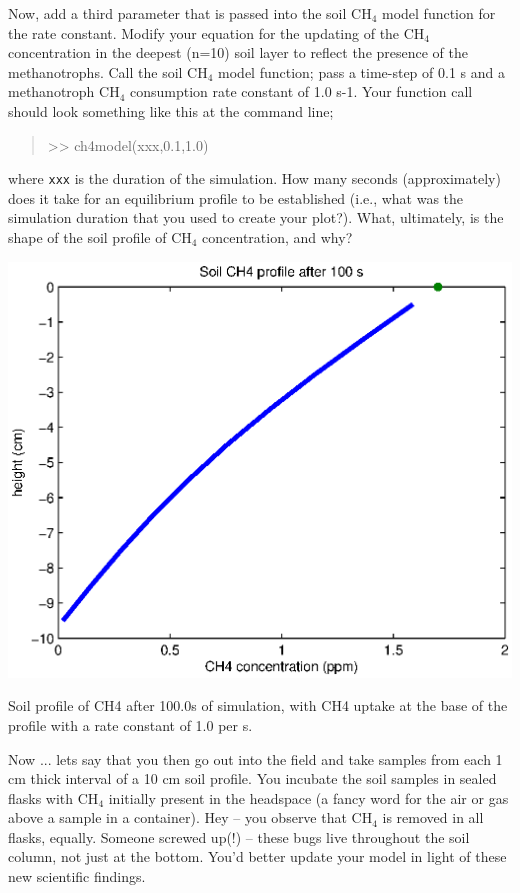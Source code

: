 \documentclass{tufte-book} %
\newenvironment{docspec}{\begin{quotation}\ttfamily\parskip0pt\parindent0pt\ignorespaces}{\end{quotation}}
\begin{document}
Now, add a third parameter that is passed into the soil CH\(_{4}\) model function for the rate constant. Modify your equation for the updating of the CH\(_{4}\) concentration in the deepest (n=10) soil layer to reflect the presence of the methanotrophs. Call the soil CH\(_{4}\) model function; pass a time-step of 0.1 s and a methanotroph CH\(_{4}\) consumption rate constant of 1.0 s-1. Your function call should look something like this at the command line;
\begin{docspec}
>> ch4model(xxx,0.1,1.0)
\end{docspec}
where \texttt{xxx} is the duration of the simulation. How many seconds (approximately) does it take for an equilibrium profile to be established (i.e., what was the simulation duration that you used to create your plot?). What, ultimately, is the shape of the soil profile of CH\(_{4}\) concentration, and why?

\begin{marginfigure}[-1.0in]
\includegraphics[width=\linewidth]{ch4-ch4model-model3.eps}
\caption{Soil profile of CH4 after 100.0s of simulation, with CH4 uptake at the base of the profile with a rate constant of 1.0 per s.}
\label{fig:ch4-ch4model-model3}
\end{marginfigure}

Now ... lets say that you then go out into the field and take samples from each 1 cm thick interval of a 10 cm soil profile. You incubate the soil samples in sealed flasks with CH\(_{4}\) initially present in the headspace (a fancy word for the air or gas above a sample in a container). Hey -- you observe that CH\(_{4}\) is removed in all flasks, equally. Someone screwed up(!) -- these bugs live throughout the soil column, not just at the bottom. You'd better update your model in light of these new scientific findings.
\end{document}

